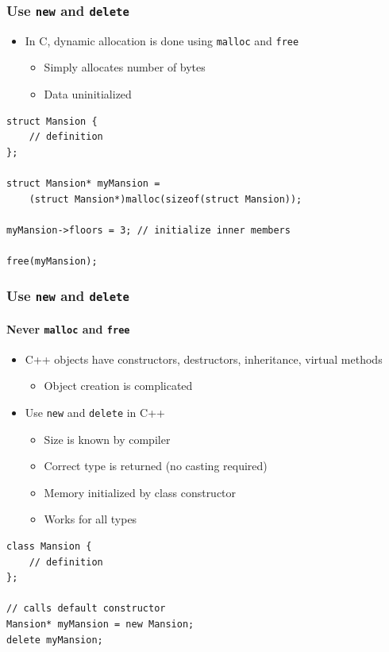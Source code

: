 \documentclass[table]{beamer}
\newcounter{rulecount}
\newcommand{\declarerule}{\textbf{\color{themeblue}{Rule \therulecount:}} }
\begin{document}

\begin{frame}[fragile]
    \frametitle{\declarerule Use \texttt{new} and \texttt{delete} }
    \begin{itemize}
        \item In C, dynamic allocation is done using \texttt{malloc} and \texttt{free}
            \begin{itemize}
                \item Simply allocates number of bytes
                \item Data uninitialized
            \end{itemize}
    \end{itemize}
    \begin{lstlisting}[title=Dynamically allocating a struct in C]
struct Mansion {
    // definition
};

struct Mansion* myMansion =
    (struct Mansion*)malloc(sizeof(struct Mansion));

myMansion->floors = 3; // initialize inner members

free(myMansion);
    \end{lstlisting}
\end{frame}

\begin{frame}[fragile]
    \frametitle{\declarerule Use \texttt{new} and \texttt{delete} }
    \framesubtitle{Never \texttt{malloc} and \texttt{free} }
    \begin{itemize}
        \item C++ objects have constructors, destructors, inheritance, virtual methods
            \begin{itemize}
                \item Object creation is complicated
            \end{itemize}
        \item Use \texttt{new} and \texttt{delete} in C++
            \begin{itemize}
                \item Size is known by compiler
                \item Correct type is returned (no casting required)
                \item Memory initialized by class constructor
                \item Works for all types
            \end{itemize}
    \end{itemize}
    \begin{lstlisting}[title=Dynamically allocating an object in C++]
class Mansion {
    // definition
};

// calls default constructor
Mansion* myMansion = new Mansion;
delete myMansion;
    \end{lstlisting}
\end{frame}
\end{document}
